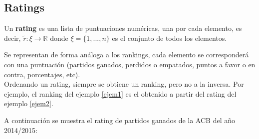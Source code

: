 \subsection{Ratings}
\begin{defi} 
	Un \textbf{rating} es una lista de puntuaciones numéricas, una por cada elemento, es decir, $\tilde{r}: \xi \rightarrow \mathbb{R}$ donde $\xi = \{1,...,n\}$ es el conjunto de todos los elementos.
\end{defi}
Se representan de forma análoga a los rankings, cada elemento se corresponderá con una puntuación (partidos ganados, perdidos o empatados, puntos a favor o en contra, porcentajes, etc).\\

Ordenando un rating, siempre se obtiene un ranking, pero no a la inversa. Por ejemplo, el ranking del ejemplo \ref{ejem1} es el obtenido a partir del rating del ejemplo \ref{ejem2}.

\newpage  
 
\begin{ejem} \label{ejem2}
 A continuación se muestra el rating de partidos ganados de la ACB del año 2014/2015:
\end{ejem}
	
